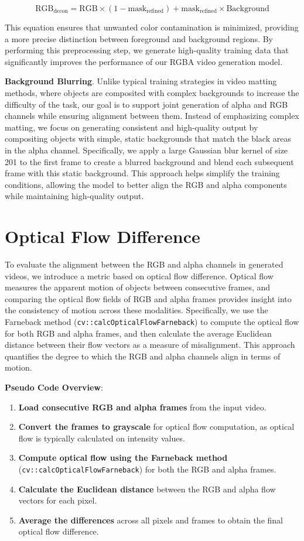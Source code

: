 \[
\text{RGB}_{\text{decon}} = \text{RGB} \times (1 - \text{mask}_{\text{refined}}) + \text{mask}_{\text{refined}} \times \text{Background}
\]

This equation ensures that unwanted color contamination is minimized, providing a more precise distinction between foreground and background regions. By performing this preprocessing step, we generate high-quality training data that significantly improves the performance of our RGBA video generation model.

\noindent\textbf{Background Blurring}. Unlike typical training strategies in video matting methods, where objects are composited with complex backgrounds to increase the difficulty of the task, our goal is to support joint generation of alpha and RGB channels while ensuring alignment between them. Instead of emphasizing complex matting, we focus on generating consistent and high-quality output by compositing objects with simple, static backgrounds that match the black areas in the alpha channel. Specifically, we apply a large Gaussian blur kernel of size 201 to the first frame to create a blurred background and blend each subsequent frame with this static background. This approach helps simplify the training conditions, allowing the model to better align the RGB and alpha components while maintaining high-quality output.

\section{Optical Flow Difference}
\label{sec:optical-flow}
To evaluate the alignment between the RGB and alpha channels in generated videos, we introduce a metric based on optical flow difference. Optical flow measures the apparent motion of objects between consecutive frames, and comparing the optical flow fields of RGB and alpha frames provides insight into the consistency of motion across these modalities. Specifically, we use the Farneback method (\texttt{cv::calcOpticalFlowFarneback}) to compute the optical flow for both RGB and alpha frames, and then calculate the average Euclidean distance between their flow vectors as a measure of misalignment. This approach quantifies the degree to which the RGB and alpha channels align in terms of motion.

\noindent\textbf{Pseudo Code Overview}:
\begin{enumerate}
    \item \textbf{Load consecutive RGB and alpha frames} from the input video.
    \item \textbf{Convert the frames to grayscale} for optical flow computation, as optical flow is typically calculated on intensity values.
    \item \textbf{Compute optical flow using the Farneback method} (\texttt{cv::calcOpticalFlowFarneback}) for both the RGB and alpha frames.
    \item \textbf{Calculate the Euclidean distance} between the RGB and alpha flow vectors for each pixel.
    \item \textbf{Average the differences} across all pixels and frames to obtain the final optical flow difference.
\end{enumerate}

